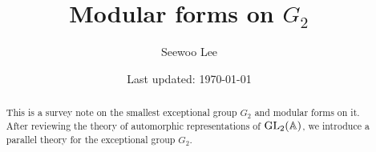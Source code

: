 \documentclass[letterpaper, 12pt]{article}
\begin{document}

\title{Modular forms on $G_2$}


\author{Seewoo Lee}
\date{\normalsize\vspace{-1ex} Last updated: \today}


\maketitle



\begin{abstract}
    This is a survey note on the smallest exceptional group $G_2$ and modular forms on it.
    After reviewing the theory of automorphic representations of $\mathrm{GL}_2(\mathbb{A})$, we introduce a parallel theory for the exceptional group $G_2$.
\end{abstract}

% 







\newpage
















\end{document}

